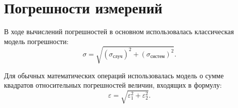 \documentclass[a4paper,12pt]{extarticle}
\begin{document}









\section{Погрешности измерений}
В ходе вычислений погрешностей в основном использовалась классическая модель погрешности:
$$ \sigma = \sqrt{(\sigma_\text{случ})^2 + (\sigma_\text{систем})^2}.$$

Для обычных математических операций использовалась модель о сумме квадратов относительных погрешностей величин, входящих в формулу:
$$ \varepsilon = \sqrt{\varepsilon_1^2 + \varepsilon_2^2}.$$
\end{document}
